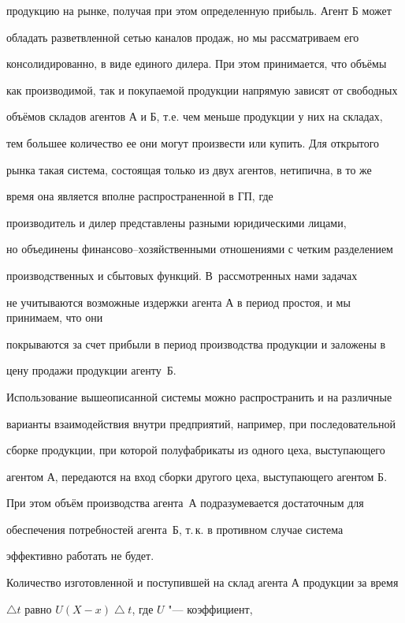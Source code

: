 продукцию на рынке, получая при этом определенную прибыль. Агент Б может

обладать разветвленной сетью каналов продаж, но мы рассматриваем его

консолидированно, в виде единого дилера. При этом принимается, что объёмы

как производимой, так и покупаемой продукции напрямую зависят от свободных

объёмов складов агентов А и Б, т.е. чем меньше продукции у них на складах,

тем большее количество ее они могут произвести или купить. Для открытого

рынка такая система, состоящая только из двух агентов, нетипична, в то же

время она является вполне распространенной в ГП, где

производитель и дилер представлены разными юридическими лицами,

но объединены финансово--хозяйственными отношениями с четким разделением

производственных и сбытовых функций. В~рассмотренных нами задачах

не учитываются возможные издержки агента А в период простоя, и мы принимаем, что они

покрываются за счет прибыли в период производства продукции и заложены в

цену продажи продукции агенту~Б.



Использование вышеописанной системы можно распространить и на различные

варианты взаимодействия внутри предприятий, например, при последовательной

сборке продукции, при которой полуфабрикаты из одного цеха, выступающего

агентом А, передаются на вход сборки другого цеха, выступающего агентом Б.

При этом объём производства агента~А подразумевается достаточным для

обеспечения потребностей агента~Б, т.\,к. в противном случае система

эффективно работать не будет.



Количество изготовленной и поступившей на склад агента А продукции за время

$\bigtriangleup t$ равно $U(X-x)\bigtriangleup t$, где $U$ "--- коэффициент,

